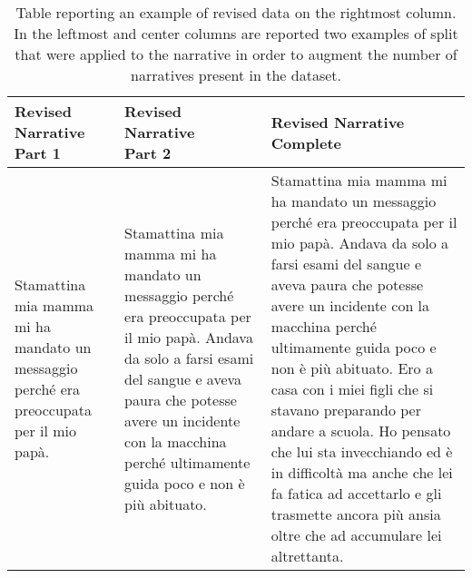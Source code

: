 \begin{table}[!htbp]
\centering
\caption{Table reporting an example of revised data on the rightmost column. In the leftmost and center columns are reported two examples of split that were applied to the narrative in order to augment the number of narratives present in the dataset.}
\label{tab:dataset-coadapt-example-split}
    \centering
    \begin{tabularx}{\linewidth}{X|X|X }
        \toprule
        \thead{Revised Narrative \\Part 1} & \thead{Revised Narrative \\Part 2}  & \thead{Revised Narrative \\Complete}\\
        \midrule
        Stamattina mia mamma mi ha mandato un messaggio perché era preoccupata per il mio papà. & Stamattina mia mamma mi ha mandato un messaggio perché era preoccupata per il mio papà. Andava da solo a farsi esami del sangue e aveva paura che potesse avere un incidente con la macchina perché ultimamente guida poco e non è più abituato. & Stamattina mia mamma mi ha mandato un messaggio perché era preoccupata per il mio papà. Andava da solo a farsi esami del sangue e aveva paura che potesse avere un incidente con la macchina perché ultimamente guida poco e non è più abituato. Ero a casa con i miei figli che si stavano preparando per andare a scuola. Ho pensato che lui sta invecchiando ed è in difficoltà ma anche che lei fa fatica ad accettarlo e gli trasmette ancora più ansia oltre che ad accumulare lei altrettanta. \\
        \bottomrule

    \end{tabularx}
\end{table}
